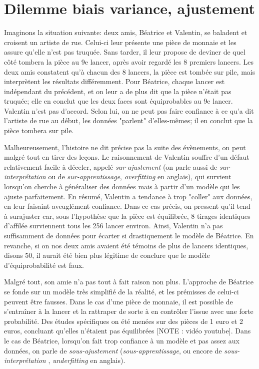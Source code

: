 \section{Dilemme biais variance, ajustement}
Imaginons la situation suivante: deux amis, Béatrice et Valentin, se baladent et croisent un artiste de rue. Celui-ci leur présente une pièce de monnaie et les assure qu'elle n'est pas truquée. Sans tarder, il leur propose de deviner de quel côté tombera la pièce au 9e lancer,  après avoir regardé les 8 premiers lancers. Les deux amis constatent qu'à chacun des 8 lancers, la pièce est tombée sur pile, mais interprètent les résultats différemment. Pour Béatrice, chaque lancer est indépendant du précédent, et on leur a de plus dit que la pièce n'était pas truquée; elle en conclut que les deux faces sont équiprobables au 9e lancer. Valentin n'est pas d'accord. Selon lui, on ne peut pas faire confiance à ce qu'a dit l'artiste de rue au début, les données "parlent" d'elles-mêmes; il en conclut que la pièce tombera sur pile.

Malheureusement, l'histoire ne dit précise pas la suite des évènements, on peut malgré tout en tirer des leçons. Le raisonnement de Valentin souffre d'un défaut relativement facile à déceler, appelé \emph{sur-ajustement} (on parle aussi de \emph{sur-interprétation} ou de \emph{sur-apprentissage}, \emph{overfitting} en anglais), qui survient lorsqu'on cherche à généraliser des données mais à partir d'un modèle qui les ajuste parfaitement. En résumé, Valentin a tendance à trop "coller" aux données, en leur faisaint aveuglément confiance. Dans ce cas précis, on pressent qu'il tend à surajuster car, sous l'hypothèse que la pièce est équilibrée, 8 tirages identiques d'affilée surviennent tous les 256 lancer environ. Ainsi, Valentin n'a pas suffisamment de données pour écarter si drastiquement le modèle de Béatrice. En revanche, si on nos deux amis avaient été témoins de plus de lancers identiques, disons 50, il aurait été bien plus légitime de conclure que le modèle d'équiprobabilité est faux.

Malgré tout, son amie n'a pas tout à fait raison non plus. L'approche de Béatrice se fonde sur un modèle très simplifié de la réalité, et les prémisses de celui-ci peuvent être fausses. Dans le cas d'une pièce de monnaie, il est possible de s'entraîner à la lancer et la rattraper de sorte à en contrôler l'issue avec une forte probabilité. Des études spécifiques on été menées sur des pièces de 1 euro et 2 euros, concluant qu'elles n'étaient pas équilibrées [NOTE : vidéo youtube]. Dans le cas de Béatrice, lorsqu'on fait trop confiance à un modèle et pas assez aux données, on parle de \emph{sous-ajustement} (\emph{sous-apprentissage}, ou encore de \emph{sous-interprétation} , \emph{underfitting} en anglais).

